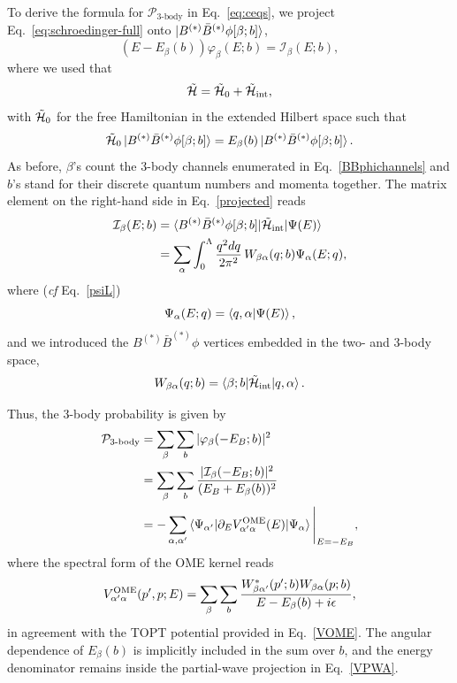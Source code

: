 \documentclass[aps,prd,showpacs,amsmath,twocolumn,superscriptaddress,floatfix,nofootinbib,notitlepage]{revtex4-2}
\newcommand{\be}{\begin{equation}}
\newcommand{\ee}{\end{equation}}
\newcommand{\dqr}{\frac{q^2dq}{2\pi^2}}
\newcommand{\tilH}{\tilde{{\cal H}}}
\begin{document}
To derive the formula for $\mathcal{P}_{3\text{-body}}$ in Eq.~\eqref{eq:ceqs}, we project Eq.~\eqref{eq:schroedinger-full} onto $\ket{B^{(*)}\bar{B}^{(*)}\phi[\beta;b]}$,
\be
(E-E_\beta(b))\varphi_\beta(E;b)={\mathcal I}_\beta(E;b),
\label{projected}
\ee
where we used that
\be
\tilH=\tilH_0+\tilH_{\mathrm{int}},
\ee 
with $\tilH_0$ for the free Hamiltonian in the extended
Hilbert space such that
\be
\tilH_0\ket{B^{(*)}\bar{B}^{(*)}\phi[\beta;b]}
=E_\beta(b) \ket{B^{(*)}\bar{B}^{(*)}\phi[\beta;b]}.
\ee
As before, $\beta$'s count the 3-body channels enumerated in Eq.~\eqref{BBphichannels} and $b$'s stand for their discrete quantum numbers and momenta together. The matrix element on the right-hand side in Eq.~\eqref{projected} reads
\be
\begin{split}
{\mathcal I}_\beta(E;b)
&=\braket{B^{(*)}\bar{B}^{(*)}\phi[\beta;b]|\tilH_{\mathrm{int}}|\Psi(E)}\\
&=\sum_{\alpha}\int_0^\Lambda\dqr\,
W_{\beta \alpha}(q;b)\Psi_\alpha(E;q),
\end{split}
\ee
where (\emph{cf} Eq.~\eqref{psiL})
\be
\Psi_\alpha(E;q)=\braket{q,\alpha|\Psi(E)},
\label{psiLE}
\ee
and we introduced the $B^{(*)}\bar{B}^{(*)}\phi$ vertices embedded
in the two- and 3-body space,
\be
W_{\beta \alpha}(q;b)=\braket{\beta;b|\tilH_{\mathrm{int}}|q,\alpha}.
\ee

Thus, the 3-body probability is given by
\be
\begin{split}
{\cal P}_{\text{3-body}}
&=\sum_\beta\sum_b|\varphi_\beta(-E_B;b)|^2\\
&=\sum_\beta\sum_b\frac{|{\mathcal I}_\beta(-E_B;b)|^2}
{(E_B+E_\beta(b))^2}\\
&=-\sum_{\alpha,\alpha'}
\braket{\Psi_{\alpha'}|\partial_E
V^{\rm OME}_{\alpha'\alpha}(E)|\Psi_\alpha} \Bigg|_{E =-E_B},
\label{eq:P-3body}
\end{split}
\ee
where the spectral form of the OME kernel reads
\be
V^{\rm OME}_{\alpha'\alpha}(p',p;E)
=\sum_\beta\sum_b
\frac{W_{\beta \alpha'}^*(p';b)W_{\beta \alpha}(p;b)}
{E-E_\beta(b)+i\epsilon},
\label{eq:topt-spectral}
\ee
in agreement with the TOPT potential provided in Eq.~\eqref{VOME}.
The angular dependence of $E_\beta(b)$ is implicitly included in the sum over $b$, and the energy denominator remains inside the partial-wave projection in Eq.~\eqref{VPWA}.
\end{document}
